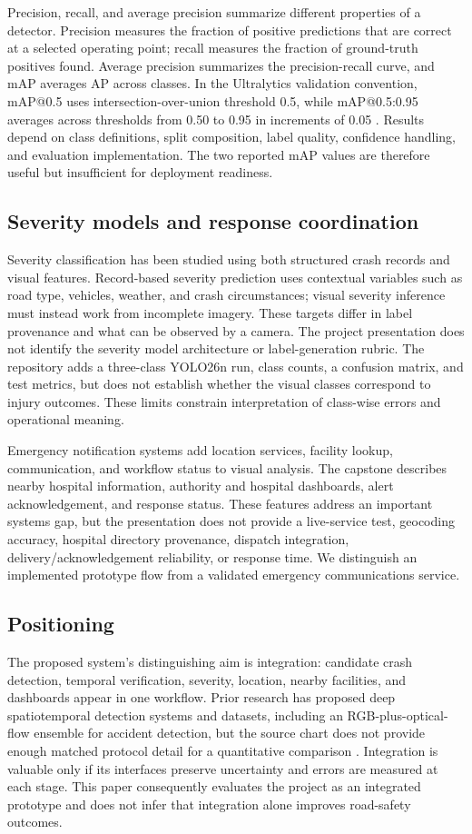 \documentclass[12pt,a4paper]{article}
\begin{document}
Precision, recall, and average precision summarize different properties of a detector. Precision measures the fraction of positive predictions that are correct at a selected operating point; recall measures the fraction of ground-truth positives found. Average precision summarizes the precision-recall curve, and mAP averages AP across classes. In the Ultralytics validation convention, mAP@0.5 uses intersection-over-union threshold 0.5, while mAP@0.5:0.95 averages across thresholds from 0.50 to 0.95 in increments of 0.05 \cite{ultralyticsval}. Results depend on class definitions, split composition, label quality, confidence handling, and evaluation implementation. The two reported mAP values are therefore useful but insufficient for deployment readiness.

\subsection{Severity models and response coordination}
Severity classification has been studied using both structured crash records and visual features. Record-based severity prediction uses contextual variables such as road type, vehicles, weather, and crash circumstances; visual severity inference must instead work from incomplete imagery. These targets differ in label provenance and what can be observed by a camera. The project presentation does not identify the severity model architecture or label-generation rubric. The repository adds a three-class YOLO26n run, class counts, a confusion matrix, and test metrics, but does not establish whether the visual classes correspond to injury outcomes. These limits constrain interpretation of class-wise errors and operational meaning.

Emergency notification systems add location services, facility lookup, communication, and workflow status to visual analysis. The capstone describes nearby hospital information, authority and hospital dashboards, alert acknowledgement, and response status. These features address an important systems gap, but the presentation does not provide a live-service test, geocoding accuracy, hospital directory provenance, dispatch integration, delivery/acknowledgement reliability, or response time. We distinguish an implemented prototype flow from a validated emergency communications service.

\subsection{Positioning}
The proposed system's distinguishing aim is integration: candidate crash detection, temporal verification, severity, location, nearby facilities, and dashboards appear in one workflow. Prior research has proposed deep spatiotemporal detection systems and datasets, including an RGB-plus-optical-flow ensemble for accident detection, but the source chart does not provide enough matched protocol detail for a quantitative comparison \cite{ade2024}. Integration is valuable only if its interfaces preserve uncertainty and errors are measured at each stage. This paper consequently evaluates the project as an integrated prototype and does not infer that integration alone improves road-safety outcomes.
\end{document}
